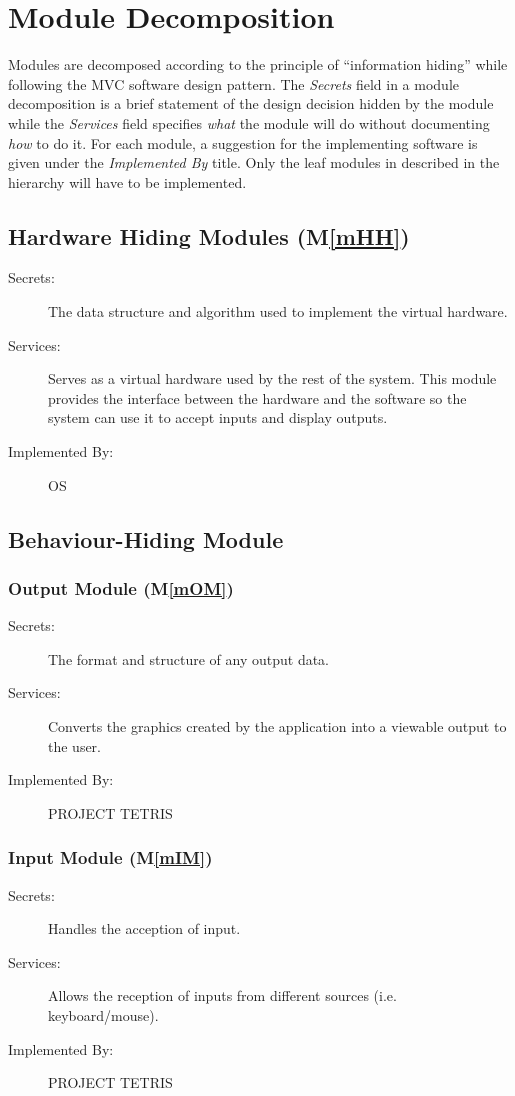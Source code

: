 \documentclass[12pt, titlepage]{article}
\newcommand{\mref}[1]{M\ref{#1}}
\begin{document}
\section{Module Decomposition} \label{SecMD}
Modules are decomposed according to the principle of ``information hiding'' while following
the MVC software design pattern. The \emph{Secrets} field in a module
decomposition is a brief statement of the design decision hidden by the
module while the \emph{Services} field specifies \emph{what} the module will do
without documenting \emph{how} to do it. For each module, a suggestion for the
implementing software is given under the \emph{Implemented By} title.
Only the leaf modules in described in the hierarchy will have to be implemented.
\subsection{Hardware Hiding Modules (\mref{mHH})}
\begin{description}
\item[Secrets:]The data structure and algorithm used to implement the virtual
  hardware.
\item[Services:]Serves as a virtual hardware used by the rest of the
  system. This module provides the interface between the hardware and the
  software so the system can use it to accept inputs and display outputs.
\item[Implemented By:] OS
\end{description}

\subsection{Behaviour-Hiding Module}
\subsubsection{Output Module (\mref{mOM})}
\begin{description}
\item[Secrets:]The format and structure of any output data.
\item[Services:] Converts the graphics created by the application into a viewable output to
the user.
\item[Implemented By:] PROJECT TETRIS
\end{description}

\subsubsection{Input Module (\mref{mIM})}
\begin{description}
\item[Secrets:] Handles the acception of input.
\item[Services:] Allows the reception of inputs from different sources (i.e. keyboard/mouse).
\item[Implemented By:] PROJECT TETRIS
\end{description}
\end{document}
